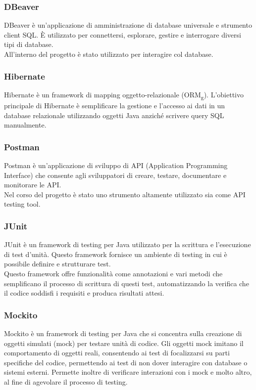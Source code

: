 \subsubsection*{DBeaver}
DBeaver è un'applicazione di amministrazione di database universale e strumento client SQL. È utilizzato per connettersi, esplorare, gestire e interrogare diversi tipi di database.\\
All'interno del progetto è stato utilizzato per interagire col database.
\\


\subsubsection*{Hibernate}
Hibernate è un framework di mapping oggetto-relazionale (ORM\textsubscript{g}). L'obiettivo principale di Hibernate è semplificare la gestione e l'accesso ai dati in un database relazionale utilizzando oggetti Java anziché scrivere query SQL manualmente.
\\


\subsubsection*{Postman}
Postman è un'applicazione di sviluppo di API (Application Programming Interface) che consente agli sviluppatori di creare, testare, documentare e monitorare le API.\\
Nel corso del progetto è stato uno strumento altamente utilizzato sia come API testing tool.\\

\subsubsection*{JUnit} 
JUnit è un framework di testing per Java utilizzato per la scrittura e l’esecuzione di test d’unità. Questo framework fornisce un ambiente di testing in cui è possibile definire e strutturare test.\\ Questo framework offre funzionalità come annotazioni e vari metodi che semplificano il processo di scrittura di questi test, automatizzando la verifica che il codice soddisfi i requisiti e produca risultati attesi.\\

\subsubsection*{Mockito}
Mockito è un framework di testing per Java che si concentra sulla creazione di oggetti simulati (mock) per testare unità di codice. Gli oggetti mock imitano il comportamento di oggetti reali, consentendo ai test di focalizzarsi su parti specifiche del codice, permettendo ai test di non dover interagire con database o sistemi esterni. Permette inoltre di verificare interazioni con i mock e molto altro, al fine di agevolare il processo di testing.\\

